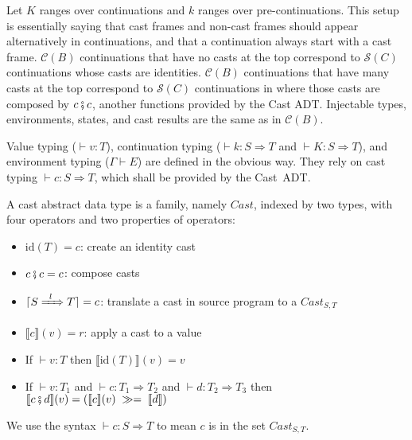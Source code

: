 \documentclass[runningheads]{llncs}
\newcommand{\CMachine}[1]{\ensuremath{\mathcal{C}(#1)}}
\newcommand{\CBMachine}[0]{\CMachine{B}}
\newcommand{\SMachine}[1]{\ensuremath{\mathcal{S}(#1)}}
\newcommand{\ccast}[3]{#1 \xRightarrow[]{\enskip #2 \enskip} #3}
\newcommand{\mbind}[0]{\ensuremath{\;\gg=\;}}
\newcommand{\denote}[1]{\ensuremath{\llbracket #1 \rrbracket}}
\newcommand{\compose}[2]{\ensuremath{#1 \fatsemi #2}}
\newcommand{\translate}[1]{\ensuremath{\lceil#1\rceil}}
\newcommand{\id}[1]{\ensuremath{\mathrm{id}(#1)}}
\newcommand{\valuetyping}[2]{\ensuremath{\vdash #1 : #2}}
\newcommand{\envtyping}[2]{\ensuremath{#1 \vdash #2}}
\newcommand{\casttyping}[3]{\ensuremath{\vdash #1 : #2 \Longrightarrow #3}}
\begin{document}
Let $K$ ranges over continuations and $k$ ranges over pre-continuations.
This setup is essentially saying that cast frames and non-cast frames should
appear alternatively in continuations, and that a continuation always start
with a cast frame.
\CMachine{B} continuations that have no casts at the top correspond
to \SMachine{C} continuations whose casts are identities.
\CMachine{B} continuations that have many casts at the top correspond
to \SMachine{C} continuations in where those casts are composed by
$\compose{c}{c}$, another functions provided by the Cast ADT.
%
Injectable types, environments, states, and cast results are the same as in \CBMachine.

Value typing (\valuetyping{v}{T}), continuation typing 
(\casttyping{k}{S}{T} and \casttyping{K}{S}{T}), and environment typing 
(\envtyping{\Gamma}{E}) are defined in the obvious way. 
They rely on cast typing \casttyping{c}{S}{T}, which shall be provided by the 
Cast~ADT.

\begin{definition}
	\label{def:cast-rep}
	A cast abstract data type is a family, namely $Cast$, indexed by two types, 
	with four operators and two properties of operators:
\begin{itemize}
	\item $\id{T}=c$: create an identity cast
	\item $\compose{c}{c}=c$: compose casts
	\item $\translate{\ccast{S}{l}{T}}=c$: translate a cast in source 
		program to a $\textit{Cast}_{S,T}$
	\item $\denote{c}(v)=r$: apply a cast to a value
	\item If $ \valuetyping{v}{T} $ then $\denote{\id{T}}(v)=v$
	\item If $ \valuetyping{v}{T_1} $ and
		$ \casttyping{c}{T_1}{T_2} $ and
		$ \casttyping{d}{T_2}{T_3} $ 
		then 
		$ \denote{\compose{c}{d}}(v) = (\denote{c}(v)\mbind\denote{d})$
\end{itemize}
We use the syntax \casttyping{c}{S}{T} to mean $c$ is in the set 
$\textit{Cast}_{S,T}$.
\end{definition}
\end{document}
